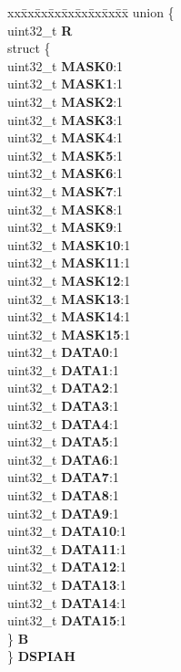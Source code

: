 \begin{DoxyCompactItemize}
\begin{tabbing}
\end{tabbing}\item 
\mbox{\label{structSIU__tag_ab78e072bfb2813de38ae4eef63a796e2}} 
\begin{tabbing}
xx\=xx\=xx\=xx\=xx\=xx\=xx\=xx\=xx\=\kill
union \{\\
\>uint32\_t {\bfseries R}\\
\>struct \{\\
\>\>uint32\_t {\bfseries MASK0}:1\\
\>\>uint32\_t {\bfseries MASK1}:1\\
\>\>uint32\_t {\bfseries MASK2}:1\\
\>\>uint32\_t {\bfseries MASK3}:1\\
\>\>uint32\_t {\bfseries MASK4}:1\\
\>\>uint32\_t {\bfseries MASK5}:1\\
\>\>uint32\_t {\bfseries MASK6}:1\\
\>\>uint32\_t {\bfseries MASK7}:1\\
\>\>uint32\_t {\bfseries MASK8}:1\\
\>\>uint32\_t {\bfseries MASK9}:1\\
\>\>uint32\_t {\bfseries MASK10}:1\\
\>\>uint32\_t {\bfseries MASK11}:1\\
\>\>uint32\_t {\bfseries MASK12}:1\\
\>\>uint32\_t {\bfseries MASK13}:1\\
\>\>uint32\_t {\bfseries MASK14}:1\\
\>\>uint32\_t {\bfseries MASK15}:1\\
\>\>uint32\_t {\bfseries DATA0}:1\\
\>\>uint32\_t {\bfseries DATA1}:1\\
\>\>uint32\_t {\bfseries DATA2}:1\\
\>\>uint32\_t {\bfseries DATA3}:1\\
\>\>uint32\_t {\bfseries DATA4}:1\\
\>\>uint32\_t {\bfseries DATA5}:1\\
\>\>uint32\_t {\bfseries DATA6}:1\\
\>\>uint32\_t {\bfseries DATA7}:1\\
\>\>uint32\_t {\bfseries DATA8}:1\\
\>\>uint32\_t {\bfseries DATA9}:1\\
\>\>uint32\_t {\bfseries DATA10}:1\\
\>\>uint32\_t {\bfseries DATA11}:1\\
\>\>uint32\_t {\bfseries DATA12}:1\\
\>\>uint32\_t {\bfseries DATA13}:1\\
\>\>uint32\_t {\bfseries DATA14}:1\\
\>\>uint32\_t {\bfseries DATA15}:1\\
\>\} {\bfseries B}\\
\} {\bfseries DSPIAH}\\


\end{tabbing}
\end{DoxyCompactItemize}
